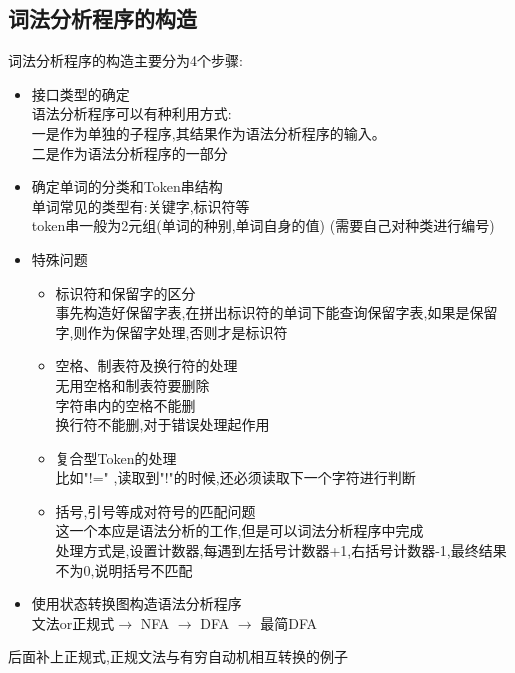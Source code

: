 \subsection{词法分析程序的构造}
词法分析程序的构造主要分为4个步骤:
\begin{itemize}
 \item 接口类型的确定\\
       语法分析程序可以有种利用方式:\\
       一是作为单独的子程序,其结果作为语法分析程序的输入。\\
       二是作为语法分析程序的一部分
 \item 确定单词的分类和Token串结构\\
       单词常见的类型有:关键字,标识符等\\
       token串一般为2元组(单词的种别,单词自身的值)  (需要自己对种类进行编号)

 \item 特殊问题
       \begin{itemize}
        \item 标识符和保留字的区分\\
              事先构造好保留字表,在拼出标识符的单词下能查询保留字表,如果是保留字,则作为保留字处理,否则才是标识符
        \item 空格、制表符及换行符的处理\\
              无用空格和制表符要删除\\
              字符串内的空格不能删\\
              换行符不能删,对于错误处理起作用
        \item 复合型Token的处理\\
              比如"!=" ,读取到"!"的时候,还必须读取下一个字符进行判断
        \item 括号,引号等成对符号的匹配问题\\
              这一个本应是语法分析的工作,但是可以词法分析程序中完成\\
              处理方式是,设置计数器,每遇到左括号计数器+1,右括号计数器-1,最终结果不为0,说明括号不匹配
       \end{itemize}

 \item 使用状态转换图构造语法分析程序\\
       文法or正规式$\to$ NFA $\to$ DFA $\to$ 最简DFA
\end{itemize}

{\color{red}后面补上正规式,正规文法与有穷自动机相互转换的例子}
